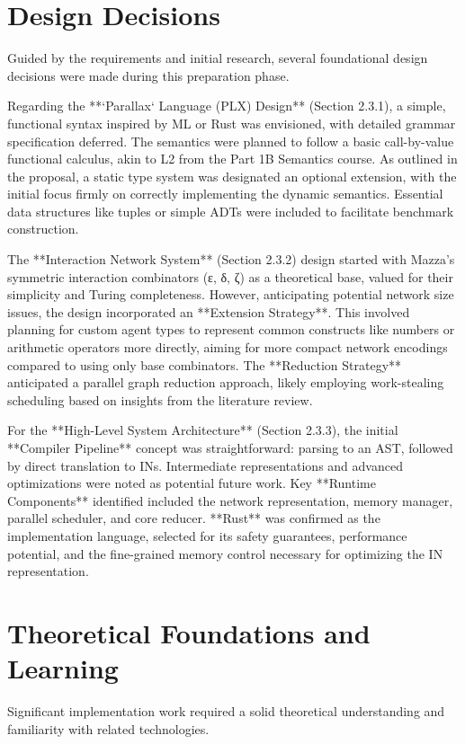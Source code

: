 \section{Design Decisions} %
Guided by the requirements and initial research, several foundational design decisions were made during this preparation phase.

Regarding the **`Parallax` Language (PLX) Design** (Section 2.3.1), a simple, functional syntax inspired by ML or Rust was envisioned, with detailed grammar specification deferred. The semantics were planned to follow a basic call-by-value functional calculus, akin to L2 from the Part 1B Semantics course. As outlined in the proposal, a static type system was designated an optional extension, with the initial focus firmly on correctly implementing the dynamic semantics. Essential data structures like tuples or simple ADTs were included to facilitate benchmark construction.

The **Interaction Network System** (Section 2.3.2) design started with Mazza's symmetric interaction combinators (ε, δ, ζ) \cite{mazza} as a theoretical base, valued for their simplicity and Turing completeness. However, anticipating potential network size issues, the design incorporated an **Extension Strategy**. This involved planning for custom agent types to represent common constructs like numbers or arithmetic operators more directly, aiming for more compact network encodings compared to using only base combinators. The **Reduction Strategy** anticipated a parallel graph reduction approach, likely employing work-stealing scheduling based on insights from the literature review.

For the **High-Level System Architecture** (Section 2.3.3), the initial **Compiler Pipeline** concept was straightforward: parsing to an AST, followed by direct translation to INs. Intermediate representations and advanced optimizations were noted as potential future work. Key **Runtime Components** identified included the network representation, memory manager, parallel scheduler, and core reducer. **Rust** was confirmed as the implementation language, selected for its safety guarantees, performance potential, and the fine-grained memory control necessary for optimizing the IN representation.

\section{Theoretical Foundations and Learning} %
Significant implementation work required a solid theoretical understanding and familiarity with related technologies.

